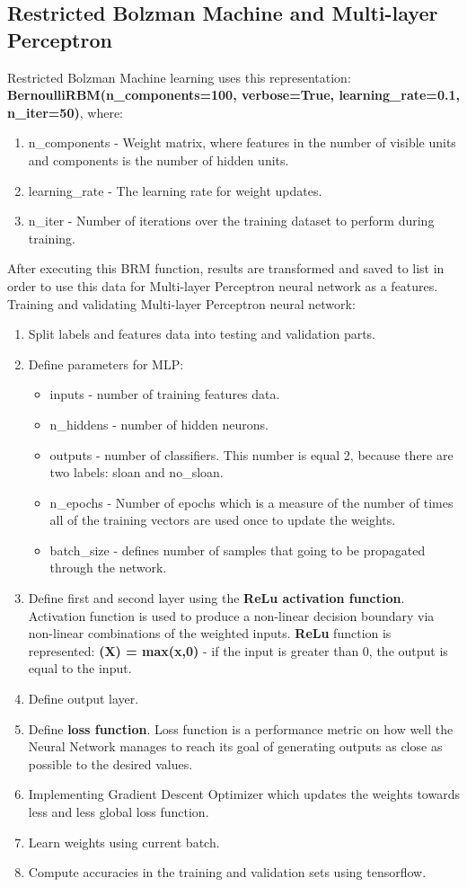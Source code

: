 \documentclass[paper=letter, fontsize=12pt]{article}
\begin{document}
\subsection{Restricted Bolzman Machine and Multi-layer Perceptron}
Restricted Bolzman Machine learning uses this representation: \textbf{BernoulliRBM(n\_components=100, verbose=True, learning\_rate=0.1, n\_iter=50)}, where:
\begin{enumerate}
\item n\_components - Weight matrix, where features in the number of visible units and components is the number of hidden units.
\item learning\_rate - The learning rate for weight updates.
\item n\_iter - Number of iterations over the training dataset to perform during training.
\end{enumerate}
After executing this BRM function, results are transformed and saved to list in order to use this data for Multi-layer Perceptron neural network as a features.
\newline
Training and validating Multi-layer Perceptron neural network:
\begin{enumerate}
\item Split labels and features data into testing and validation parts.  
\item Define parameters for MLP: 
	\begin{itemize}
    	\item inputs - number of training features data.
        \item n\_hiddens - number of hidden neurons.
        \item outputs - number of classifiers. This number is equal 2, because there are two labels: sloan and no\_sloan.
        \item n\_epochs - Number of epochs which is a measure of the number of times all of the training vectors are used once to update the 							weights.
        \item batch\_size - defines number of samples that going to be propagated through the network.
    \end{itemize}
\item Define first and second layer using the \textbf{ReLu activation function}. Activation function is used to produce a non-linear decision boundary via non-linear combinations of the weighted inputs. \textbf{ReLu} function is represented: \textbf{(X) = max(x,0)} - if the input is greater than 0, the output is equal to the input.
\item Define output layer.
\item Define \textbf{loss function}. Loss function is a performance metric on how well the Neural Network manages to reach its goal of generating outputs as close as possible to the desired values.
\item Implementing Gradient Descent Optimizer which updates the weights towards less and less global loss function.
\item Learn weights using current batch.
\item Compute accuracies in the training and validation sets using tensorflow.
\end{enumerate}
\end{document}
